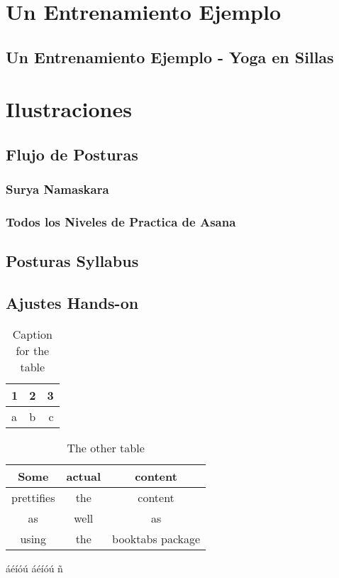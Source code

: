 \documentclass[a4paper]{article}
\begin{document}
\section{Un Entrenamiento Ejemplo}
\subsection{Un Entrenamiento Ejemplo - Yoga en Sillas}

\section{Ilustraciones}
\subsection{Flujo de Posturas}
\subsubsection{Surya Namaskara}
\subsubsection{Todos los Niveles de Practica de Asana}
\subsection{Posturas Syllabus}
\subsection{Ajustes Hands-on}



\begin{table}[h!]
	\centering
	\begin{tabular}{l|c||r}
		1 & 2 & 3\\
		\hline
		a & b & c\\
	\end{tabular}
	\caption{Caption for the table}
	\label{tab:table}
\end{table}


\begin{table}[h!]
	\centering
	\begin{tabular}{ccc}
		\toprule
		Some & actual & content\\
		\midrule
		prettifies & the & content\\
		as & well & as \\
		using & the & booktabs package\\
		\bottomrule
	\end{tabular}
	\caption{The other table}
	\label{tab:table2}
\end{table}


\newpage
áéíóú
\'a\'e\'i\'o\'u
ñ
\end{document}
